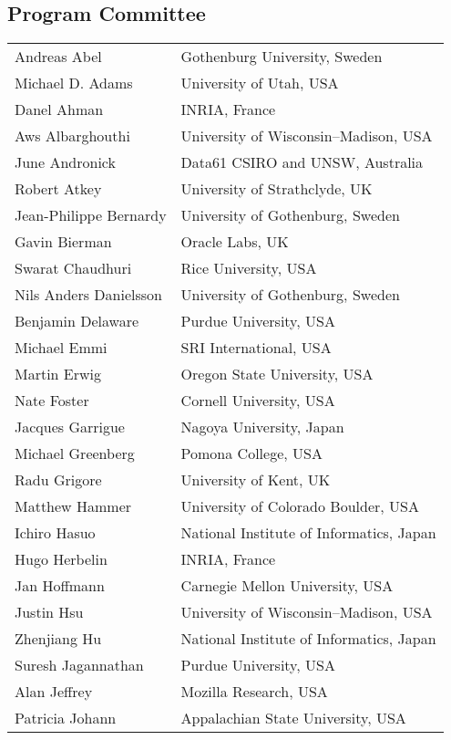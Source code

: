 \subsection*{\sffamily Program Committee}

\begin{tabular}{@{}p{\namewidth}l@{}}
Andreas Abel & Gothenburg University, Sweden \\
Michael D. Adams & University of Utah, USA \\
Danel Ahman & INRIA, France \\
Aws Albarghouthi & University of Wisconsin--Madison, USA \\
June Andronick & Data61 CSIRO and UNSW, Australia \\
Robert Atkey & University of Strathclyde, UK \\
Jean-Philippe Bernardy & University of Gothenburg, Sweden \\
Gavin Bierman & Oracle Labs, UK \\
Swarat Chaudhuri & Rice University, USA \\
Nils Anders Danielsson & University of Gothenburg, Sweden \\
Benjamin Delaware & Purdue University, USA \\
Michael Emmi & SRI International, USA \\
Martin Erwig & Oregon State University, USA \\
Nate Foster & Cornell University, USA \\
Jacques Garrigue & Nagoya University, Japan \\
Michael Greenberg & Pomona College, USA \\
Radu Grigore & University of Kent, UK \\
Matthew Hammer & University of Colorado Boulder, USA \\
Ichiro Hasuo & National Institute of Informatics, Japan \\
Hugo Herbelin & INRIA, France \\
Jan Hoffmann & Carnegie Mellon University, USA \\
Justin Hsu & University of Wisconsin--Madison, USA \\
Zhenjiang Hu & National Institute of Informatics, Japan \\
Suresh Jagannathan & Purdue University, USA \\
Alan Jeffrey & Mozilla Research, USA \\
Patricia Johann & Appalachian State University, USA \\

\end{tabular}
